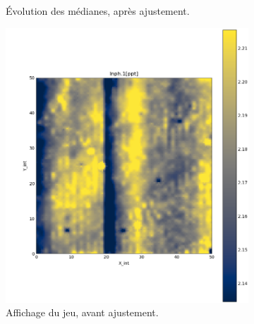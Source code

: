\documentclass[12pt]{article}
\begin{document}
\begin{figure}[ht!]
\begin{subfigure}[b]{0.475\textwidth}
            \caption[]%
            {{\small Évolution des médianes, après ajustement.}}
            \label{fig:2_evol_base_man_b}
        \end{subfigure}
        \centering
        \begin{subfigure}[b]{0.475\textwidth}
            \centering
            \includegraphics[width=\textwidth]{Images/Base_man_grid_Avant_sq1.png}
            \caption[]%
            {{ \small Affichage du jeu, avant ajustement.}}
            \label{fig:2_evol_base_man_c}
        \end{subfigure}
        \hfill
        \begin{subfigure}[b]{0.475\textwidth}  
            \centering 

\end{subfigure}
\end{figure}
\end{document}
